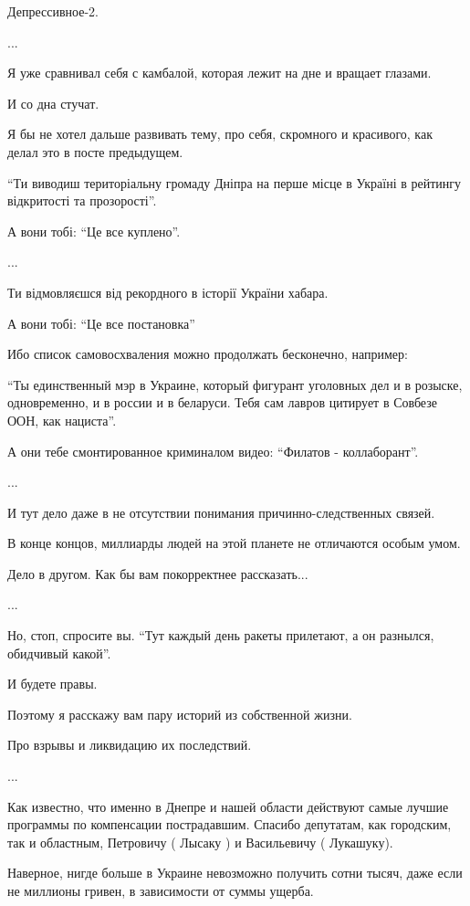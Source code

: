 Депрессивное-2.\par
...\par
Я уже сравнивал себя с камбалой, которая лежит на дне и вращает глазами.\par
И со дна стучат.\par
Я бы не хотел дальше развивать тему, про себя, скромного и красивого, как делал это в посте предыдущем.\par
\enquote{Ти виводиш територіальну громаду Дніпра на перше місце в Україні в рейтингу відкритості та прозорості}.\par
А вони тобі: \enquote{Це все куплено}.\par
...\par
Ти відмовляєшся від рекордного в історії України хабара.\par
А вони тобі: \enquote{Це все постановка}\par
Ибо список самовосхваления можно продолжать бесконечно, например:\par
\enquote{Ты единственный мэр в Украине, который фигурант уголовных дел и в розыске, одновременно, и в россии и в беларуси. Тебя сам лавров цитирует в Совбезе ООН, как нациста}.\par
А они тебе смонтированное криминалом видео: \enquote{Филатов - коллаборант}.\par
...\par
И тут дело даже в не отсутствии понимания причинно-следственных связей. \par
В конце концов, миллиарды людей на этой планете не отличаются особым умом.\par
Дело в другом. Как бы вам покорректнее рассказать...\par
...\par
Но, стоп, спросите вы. \enquote{Тут каждый день ракеты прилетают, а он разнылся, обидчивый какой}.\par
И будете правы.\par
Поэтому я расскажу вам пару историй из собственной жизни. \par
Про взрывы и ликвидацию их последствий.\par
...\par
Как известно, что именно в Днепре и нашей области действуют самые лучшие программы по компенсации пострадавшим. Спасибо депутатам, как городским, так и областным, Петровичу ( Лысаку ) и Васильевичу ( Лукашуку).\par
Наверное, нигде больше в Украине невозможно получить сотни тысяч, даже если не миллионы гривен, в зависимости от суммы ущерба.\par
